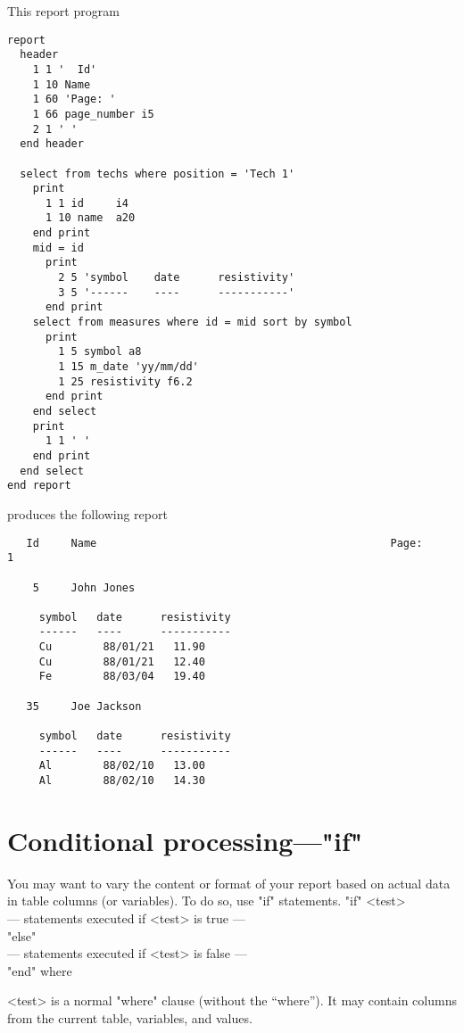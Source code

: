 \demobreak
This report program
\begin{verbatim}
report
  header
    1 1 '  Id'
    1 10 Name
    1 60 'Page: '
    1 66 page_number i5
    2 1 ' '
  end header
 
  select from techs where position = 'Tech 1'
    print
      1 1 id     i4
      1 10 name  a20
    end print
    mid = id
      print
        2 5 'symbol    date      resistivity'
        3 5 '------    ----      -----------'
      end print
    select from measures where id = mid sort by symbol
      print
        1 5 symbol a8
        1 15 m_date 'yy/mm/dd'
        1 25 resistivity f6.2
      end print
    end select
    print
      1 1 ' '
    end print
  end select
end report
\end{verbatim}
\demobreak
produces the following report
 
\Rimdisp
\begin{verbatim}
   Id     Name                                              Page:     1
 
    5     John Jones
 
     symbol   date      resistivity
     ------   ----      -----------
     Cu        88/01/21   11.90
     Cu        88/01/21   12.40
     Fe        88/03/04   19.40
 
   35     Joe Jackson
 
     symbol   date      resistivity
     ------   ----      -----------
     Al        88/02/10   13.00
     Al        88/02/10   14.30
\end{verbatim}
\enddisp
 
 
 
\section{Conditional processing---"if"}
%
You may want to vary the content or format of your report
based on actual data in table columns (or variables).
To do so, use "if" statements.
\<"if" <test>\\
  --- statements executed if <test> is true ---\\
  "else"\\
  --- statements executed if <test> is false ---\\
  "end" \>
where
\begin{List}
\item[<test>] is a normal "where" clause (without the
``where'').  It may contain columns from the current table,
variables, and values.
\end{List}
 
